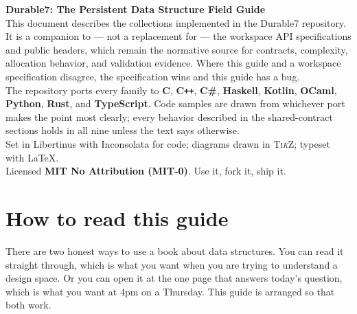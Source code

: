\documentclass[11pt,twoside,openright]{book}
\begin{document}
\thispagestyle{empty}
\null\vfill
\begin{flushleft}\small\color{d7slate}
\textbf{\sffamily Durable7: The Persistent Data Structure Field Guide}\\[6pt]
This document describes the collections implemented in the Durable7 repository.
It is a companion to --- not a replacement for --- the workspace API
specifications and public headers, which remain the normative source for
contracts, complexity, allocation behavior, and validation evidence.
Where this guide and a workspace specification disagree, the specification
wins and this guide has a bug.\\[10pt]
The repository ports every family to \textbf{C}, \textbf{C\texttt{++}},
\textbf{C\#}, \textbf{Haskell}, \textbf{Kotlin}, \textbf{OCaml},
\textbf{Python}, \textbf{Rust}, and \textbf{TypeScript}. Code samples are drawn
from whichever port makes the point most clearly; every behavior described in
the shared-contract sections holds in all nine unless the text says
otherwise.\\[10pt]
Set in Libertinus with Inconsolata for code; diagrams drawn in \textsc{Ti\emph{k}Z};
typeset with \LaTeX.\\[10pt]
Licensed \textbf{MIT No Attribution (MIT-0)}. Use it, fork it, ship it.
\end{flushleft}
\vspace{18pt}

\cleardoublepage
\pagestyle{plain}
\setcounter{tocdepth}{1}
{\hypersetup{linkcolor=d7ink}
 \renewcommand{\contentsname}{Contents}
 \tableofcontents}

\cleardoublepage
\pagestyle{d7main}
\chapter*{How to read this guide}

There are two honest ways to use a book about data structures. You can read it
straight through, which is what you want when you are trying to understand a
design space. Or you can open it at the one page that answers today's question,
which is what you want at 4pm on a Thursday. This guide is arranged so that both
work.
\end{document}
